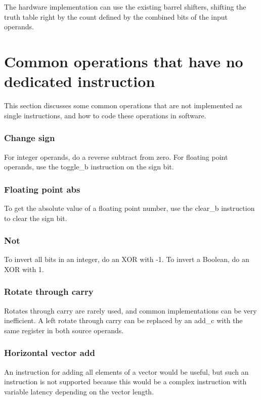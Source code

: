\documentclass[forwardcom.tex]{subfiles}
\begin{document}
The hardware implementation can use the existing barrel shifters, shifting the truth table right by the count defined by the combined bits of the input operands.



\section{Common operations that have no dedicated instruction}
This section discusses some common operations that are not implemented as single instructions, and how to code these operations in software.

\subsubsection{Change sign}
For integer operands, do a reverse subtract from zero. For floating point operands, use the toggle\_b instruction on the sign bit.

\subsubsection{Floating point abs}
To get the absolute value of a floating point number, use the clear\_b instruction to clear the sign bit.

\subsubsection{Not}
To invert all bits in an integer, do an XOR with -1. To invert a Boolean, do an XOR with 1.

\subsubsection{Rotate through carry}
Rotates through carry are rarely used, and common implementations can be very inefficient. A left rotate through carry can be replaced by an add\_c with the same register in both source operands.

\subsubsection{Horizontal vector add} \label{horizontalVectorAdd}
An instruction for adding all elements of a vector would be useful, but such an instruction is not supported because this would be a complex instruction with variable latency depending on the vector length.
\vspace{2mm}
\end{document}

